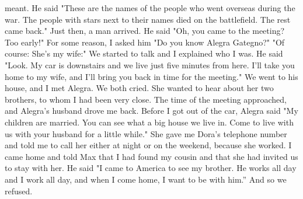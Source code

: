 meant. 
He said "These are the names of the people who went overseas during the war. The 
people with stars next to their names died on the battlefield. The rest came back." 
Just then, a man arrived. He said "Oh, you came to the meeting? Too early!" 
For some reason, I asked him "Do you know Alegra Gategno?" 
"Of course: She's my wife:" 
We started to talk and I explained who I was. He said "Look. My car is downstairs 
and we live just five minutes from here. I’ll take you home to my wife, and I'll 
bring you back in time for the meeting." 
We went to his house, and I met Alegra. We both cried. She wanted to hear about 
her two brothers, to whom I had been very close. The time of the meeting approached, 
and Alegra's husband drove me back. Before I got out of the car, Alegra said "My children are married. You can see what a big house we live in. Come to live with us with 
your husband for a little while." She gave me Dora's telephone number and told me to 
call her either at night or on the weekend, because she worked. 
I came home and told Max that I had found my cousin and that she had invited us to 
stay with her. He said "I came to America to see my brother. He works all day and I work all day, and when I come home, I want to be with him.” And so we refused.

